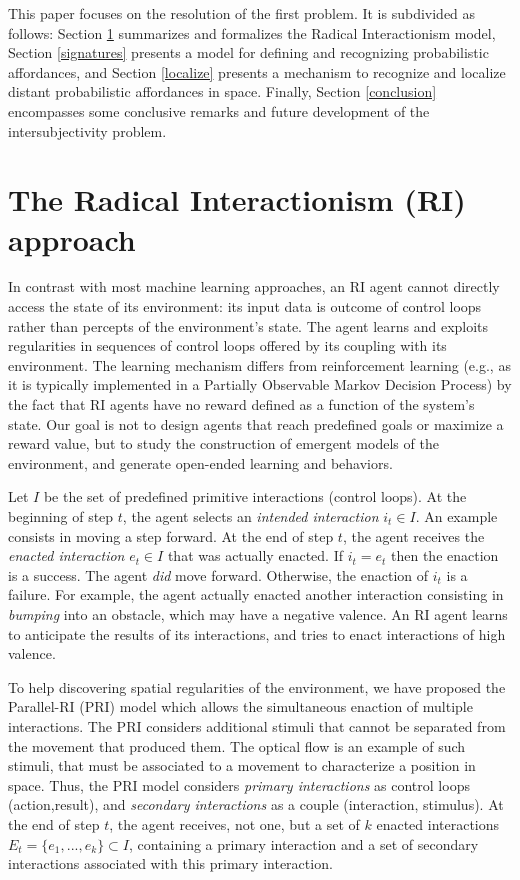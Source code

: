 \documentclass[conference]{IEEEtran}
\makeatletter
\let\cite\relax
\DeclareRobustCommand{\cite}{%
	\let\new@cite@pre\@gobble
	\@ifnextchar[\new@cite{\@citex[]}}
\def\new@cite[#1]{\@ifnextchar[{\new@citea{#1}}{\@citex[#1]}}
\def\new@citea#1{\def\new@cite@pre{#1}\@citex}
\makeatother
\begin{document}
This paper focuses on the resolution of the first problem. 
It is subdivided as follows: Section \ref{RI} summarizes and formalizes the Radical Interactionism model, Section \ref{signatures} presents a model for defining and recognizing probabilistic affordances, and Section \ref{localize} presents a mechanism to recognize and localize distant probabilistic affordances in space. Finally, Section \ref{conclusion} encompasses some conclusive remarks and future development of the intersubjectivity problem.




\section{The Radical Interactionism (RI) approach}\label{RI}

In contrast with most machine learning approaches, an RI agent cannot directly access the state of its environment: its input data is outcome of control loops rather than percepts of the environment's state.
The agent learns and exploits regularities in sequences of control loops offered by its coupling with its environment.
The learning mechanism differs from reinforcement learning (e.g., as it is typically implemented in a Partially Observable Markov Decision Process) by the fact that RI agents have no reward defined as a function of the system's state.
Our goal is not to design agents that reach predefined goals or maximize a reward value, but to study the construction of emergent models of the environment, and generate open-ended learning and behaviors.

Let $I$ be the set of predefined primitive interactions (control loops).
At the beginning of step $t$, the agent selects an \textit{intended interaction} $i_t \in I$.
An example consists in moving a step forward.
At the end of step $t$, the agent receives the \textit{enacted interaction} $e_t \in I$ that was actually enacted. 
If $i_t = e_t$ then the enaction is a success. 
The agent \textit{did} move forward.
Otherwise, the enaction of $i_t$ is a failure.
For example, the agent actually enacted another interaction consisting in \textit{bumping} into an obstacle, which may have a negative valence.
An RI agent learns to anticipate the results of its interactions, and tries to enact interactions of high valence.

To help discovering spatial regularities of the environment, we have proposed the Parallel-RI (PRI) model \cite{gay:space} which allows the simultaneous enaction of multiple interactions.
The PRI considers additional stimuli that cannot be separated from the movement that produced them. The optical flow is an example of such stimuli, that must be associated to a movement to characterize a position in space. Thus, the PRI model considers \textit{primary interactions} as control loops (action,result), and \textit{secondary interactions} as a couple (interaction, stimulus).
At the end of step $t$, the agent receives, not one, but a set of $k$ enacted interactions $E_t=\{e_1,..., e_k\} \subset I$, containing a primary interaction and a set of secondary interactions associated with this primary interaction.
\end{document}
